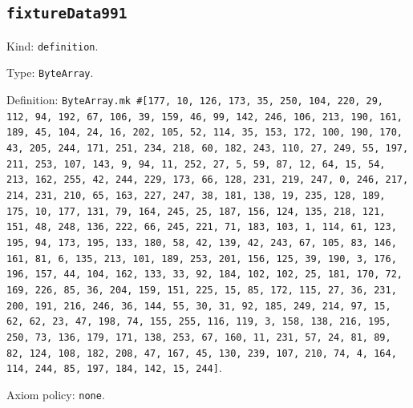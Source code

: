 \documentclass[11pt]{article}
\begin{document}
\subsection*{\texttt{fixtureData991}}
\noindent Kind: \texttt{definition}.\par
\noindent Type: \texttt{ByteArray}.\par
\noindent Definition: \texttt{ByteArray.mk \#[177, 10, 126, 173, 35, 250, 104, 220, 29, 112, 94, 192, 67, 106, 39, 159, 46, 99, 142, 246, 106, 213, 190, 161, 189, 45, 104, 24, 16, 202, 105, 52, 114, 35, 153, 172, 100, 190, 170, 43, 205, 244, 171, 251, 234, 218, 60, 182, 243, 110, 27, 249, 55, 197, 211, 253, 107, 143, 9, 94, 11, 252, 27, 5, 59, 87, 12, 64, 15, 54, 213, 162, 255, 42, 244, 229, 173, 66, 128, 231, 219, 247, 0, 246, 217, 214, 231, 210, 65, 163, 227, 247, 38, 181, 138, 19, 235, 128, 189, 175, 10, 177, 131, 79, 164, 245, 25, 187, 156, 124, 135, 218, 121, 151, 48, 248, 136, 222, 66, 245, 221, 71, 183, 103, 1, 114, 61, 123, 195, 94, 173, 195, 133, 180, 58, 42, 139, 42, 243, 67, 105, 83, 146, 161, 81, 6, 135, 213, 101, 189, 253, 201, 156, 125, 39, 190, 3, 176, 196, 157, 44, 104, 162, 133, 33, 92, 184, 102, 102, 25, 181, 170, 72, 169, 226, 85, 36, 204, 159, 151, 225, 15, 85, 172, 115, 27, 36, 231, 200, 191, 216, 246, 36, 144, 55, 30, 31, 92, 185, 249, 214, 97, 15, 62, 62, 23, 47, 198, 74, 155, 255, 116, 119, 3, 158, 138, 216, 195, 250, 73, 136, 179, 171, 138, 253, 67, 160, 11, 231, 57, 24, 81, 89, 82, 124, 108, 182, 208, 47, 167, 45, 130, 239, 107, 210, 74, 4, 164, 114, 244, 85, 197, 184, 142, 15, 244]}.\par
\noindent Axiom policy: \texttt{none}.\par
\end{document}
